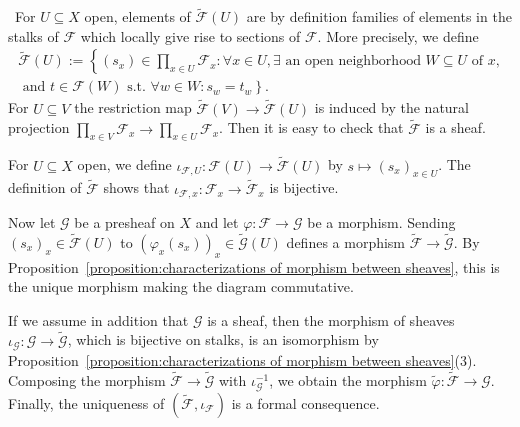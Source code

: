 \documentclass[12pt,a4paper]{book}
\newenvironment{prooff}{{\noindent\it\textcolor{cyan!40!black}{Proof}:}\,}{\par}
\theoremstyle{definition}
\begin{document}
\begin{prooff}
    For $U \subseteq X$ open, elements of $\tilde{\mathscr{F}}(U)$ are by definition families of elements in the stalks of $\mathscr{F}$ which locally give rise to sections of $\mathscr{F}$. More precisely, we define
    \begin{align*}
        \tilde{\mathscr{F}}(U):=\left\{\left(s_x\right) \in \prod_{x \in U} \mathscr{F}_x : \forall x \in U, \exists  \text { an open neighborhood } W \subseteq U \text { of } x,\right. \\
        \text { and } \left.t \in \mathscr{F}(W) \text{ s.t. } \forall w \in W: s_w=t_w\right\} .
    \end{align*}
    For $U \subseteq V$ the restriction map $\tilde{\mathscr{F}}(V) \rightarrow \tilde{\mathscr{F}}(U)$ is induced by the natural projection $\prod_{x \in V} \mathscr{F}_x \rightarrow \prod_{x \in U} \mathscr{F}_x$. Then it is easy to check that $\tilde{\mathscr{F}}$ is a sheaf.

    For $U \subseteq X$ open, we define $\iota_{\mathscr{F}, U}: \mathscr{F}(U) \rightarrow \tilde{\mathscr{F}}(U)$ by $s \mapsto\left(s_x\right)_{x \in U}$. The definition of $\tilde{\mathscr{F}}$ shows that $\iota_{\mathscr{F}, x}: \mathscr{F}_x \rightarrow \tilde{\mathscr{F}}_x$ is bijective.

    Now let $\mathscr{G}$ be a presheaf on $X$ and let $\varphi: \mathscr{F} \rightarrow \mathscr{G}$ be a morphism. Sending $\left(s_x\right)_x \in \tilde{\mathscr{F}}(U)$ to $\left(\varphi_x\left(s_x\right)\right)_x \in \tilde{\mathscr{G}}(U)$ defines a morphism $\tilde{\mathscr{F}} \rightarrow \tilde{\mathscr{G}}$. By Proposition~\ref{proposition:characterizations of morphism between sheaves}, this is the unique morphism making the diagram commutative.

    If we assume in addition that $\mathscr{G}$ is a sheaf, then the morphism of sheaves $\iota_{\mathscr{G}}: \mathscr{G} \rightarrow \tilde{\mathscr{G}}$, which is bijective on stalks, is an isomorphism by Proposition~\ref{proposition:characterizations of morphism between sheaves}(3). Composing the morphism $\tilde{\mathscr{F}} \rightarrow \tilde{\mathscr{G}}$ with $\iota_{\mathscr{G}}^{-1}$, we obtain the morphism $\tilde{\varphi}: \tilde{\mathscr{F}} \rightarrow \mathscr{G}$. Finally, the uniqueness of $\left(\tilde{\mathscr{F}}, \iota_{\mathscr{F}}\right)$ is a formal consequence.
\end{prooff}
\end{document}
